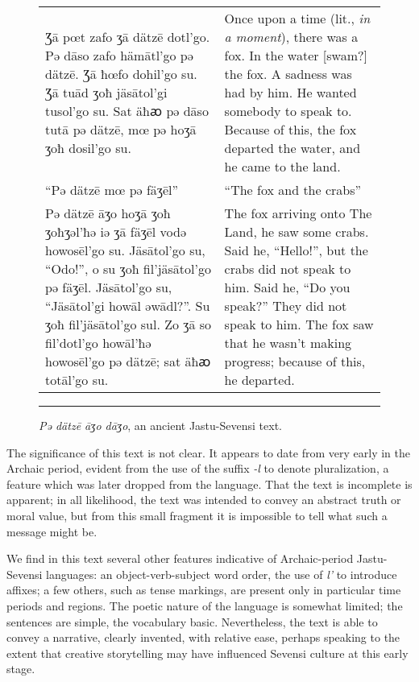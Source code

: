 \begin{figure}[ht]

\centering\small

\begin{tabular}{p{200pt}p{200pt}}
{\raggedleft Ʒā pœt zafo ʒā dätzē dotl’go.
Pǝ dāso zafo hämātl’go pǝ dätzē.
Ʒā ħœfo dohil'go su.
Ʒā tuād ʒoħ jäsātol’gi tusol’go su.
Sat äħꜵ pǝ dāso tutā pǝ dätzē, mœ pǝ hoʒā ʒoħ dosil’go su.\par}
&{\raggedright Once upon a time (lit., \emph{in a moment}), there was a fox.
In the water [swam?] the fox.
A sadness was had by him.
He wanted somebody to speak to.
Because of this, the fox departed the water, and he came to the land.\par}
\\{\raggedleft “Pə dätzē mœ pə fäʒēl”\par}
&{\raggedright “The fox and the crabs”\par}
\\{\raggedleft Pə dätzē āʒo hoʒā ʒoħ ʒoħʒəl'ħə iə ʒā fäʒēl vodə howosēl'go su.
Jäsātol'go su, “Odo!”, o su ʒoħ fil'jäsātol'go pə fäʒēl.
Jäsātol'go su, “Jäsātol'gi howāl əwādl?”.
Su ʒoħ fil'jäsātol'go sul.
Zo ʒā so fil'dotl'go howāl'ħə howosēl'go pə dätzē; sat äħꜵ totāl'go su.\par}
&{\raggedright The fox arriving onto The Land, he saw some crabs.
Said he, “Hello!”, but the crabs did not speak to him.
Said he, “Do you speak?”
They did not speak to him.
The fox saw that he wasn't making progress; because of this, he departed.\par}
\end{tabular}

\caption{\emph{Pə dätzē āʒo dāʒo}, an ancient Jastu-Sevensi text.}
\label{archaic-translation}

\medskip\hrule

\end{figure}

The significance of this text is not clear.
It appears to date from very early in the Archaic period, evident from the use of the suffix \emph{-l} to denote pluralization, a feature which was later dropped from the language.
That the text is incomplete is apparent; in all likelihood, the text was intended to convey an abstract truth or moral value, but from this small fragment it is impossible to tell what such a message might be.

We find in this text several other features indicative of Archaic-period Jastu-Sevensi languages: an object-verb-subject word order, the use of \emph{l'} to introduce affixes; a few others, such as tense markings, are present only in particular time periods and regions.
The poetic nature of the language is somewhat limited; the sentences are simple, the vocabulary basic.
Nevertheless, the text is able to convey a narrative, clearly invented, with relative ease, perhaps speaking to the extent that creative storytelling may have influenced Sevensi culture at this early stage.


